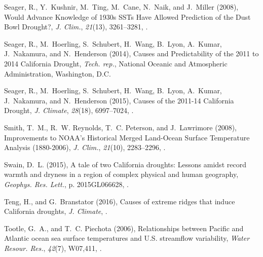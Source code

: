 \documentclass[final, double]{ua-thesis}
\begin{document}
\begin{thebibliography}{59}
Seager, R., Y.~Kushnir, M.~Ting, M.~Cane, N.~Naik, and J.~Miller (2008), Would
  {Advance} {Knowledge} of 1930s {SSTs} {Have} {Allowed} {Prediction} of the
  {Dust} {Bowl} {Drought}?, \textit{J. Clim.}, \textit{21}(13), 3261--3281,
  .

Seager, R., M.~Hoerling, S.~Schubert, H.~Wang, B.~Lyon, A.~Kumar, J.~Nakamura,
  and N.~Henderson (2014), Causes and {Predictability} of the 2011 to 2014
  {California} {Drought}, \textit{Tech. rep.}, National Oceanic and Atmospheric
  Administration, Washington, D.C.

Seager, R., M.~Hoerling, S.~Schubert, H.~Wang, B.~Lyon, A.~Kumar, J.~Nakamura,
  and N.~Henderson (2015), Causes of the 2011-14 {California} {Drought},
  \textit{J. Climate}, \textit{28}(18), 6997--7024,
  .

Smith, T.~M., R.~W. Reynolds, T.~C. Peterson, and J.~Lawrimore (2008),
  Improvements to {NOAA}'s {Historical} {Merged} {Land}-{Ocean} {Surface}
  {Temperature} {Analysis} (1880-2006), \textit{J. Clim.}, \textit{21}(10),
  2283--2296, .

Swain, D.~L. (2015), A tale of two {California} droughts: {Lessons} amidst
  record warmth and dryness in a region of complex physical and human
  geography, \textit{Geophys. Res. Lett.}, p. 2015GL066628,
  .

Teng, H., and G.~Branstator (2016), Causes of extreme ridges that induce
  {California} droughts, \textit{J. Climate}, .

Tootle, G.~A., and T.~C. Piechota (2006), Relationships between {Pacific} and
  {Atlantic} ocean sea surface temperatures and {U}.{S}. streamflow
  variability, \textit{Water Resour. Res.}, \textit{42}(7), W07,411,
  .


\end{thebibliography}
\end{document}
